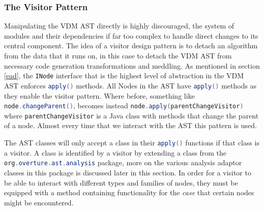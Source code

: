 	\subsubsection{The Visitor Pattern} \label{vp}
	Manipulating the VDM AST directly is highly discouraged, the system of modules and their dependencies if far too complex to handle direct changes to its central component. The idea of a visitor design pattern is to detach an algorithm from the data that it runs on, in this case to detach the VDM AST from necessary code generation transformations and meddling. As mentioned in section \ref{ead}, the \lstinline[language=Java]{INode} interface that is the highest level of abstraction in the VDM AST enforces \lstinline[language=Java]{apply()} methods. All Nodes in the AST have \lstinline[language=Java]{apply()} methods as they enable the visitor pattern. Where before, something like \lstinline[language=Java]{node.changeParent()}, becomes instead \lstinline[language=Java]{node.apply(parentChangeVisitor)} where \lstinline[language=Java]{parentChangeVisitor} is a Java class with methods that change the parent of a node. Almost every time that we interact with the AST this pattern is used.

	The AST classes will only accept a class in their \lstinline[language=Java]{apply()} functions if that class is a visitor. A class is identified by a visitor by extending a class from the \lstinline[language=Java]{org.overture.ast.analysis} package, more on the various analysis adaptor classes in this package is discussed later in this section. In order for a visitor to be able to interact with different types and families of nodes, they must be equipped with a method containing functionality for the \emph{case} that certain nodes might be encountered.

